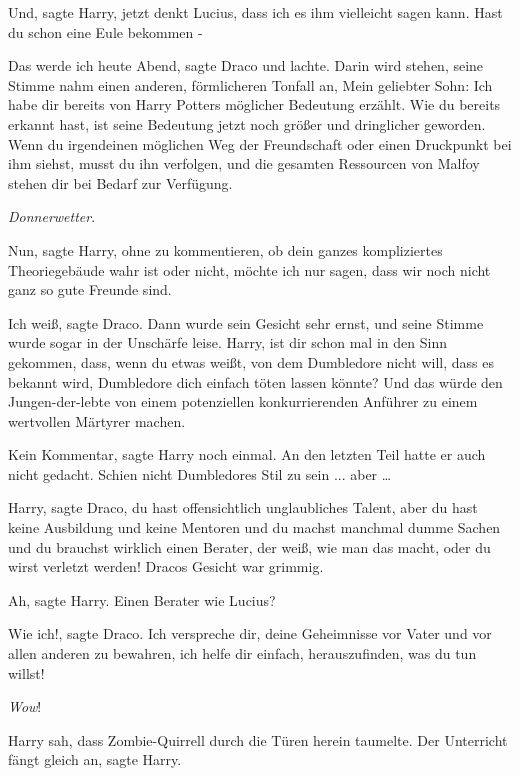 \glqq Und\grqq{}, sagte Harry, \glqq jetzt denkt Lucius, dass ich es ihm
vielleicht sagen kann. Hast du schon eine Eule bekommen -\grqq{}

\glqq Das werde ich heute Abend\grqq{}, sagte Draco und lachte. \glqq Darin wird
stehen\grqq{}, seine Stimme nahm einen anderen, förmlicheren Tonfall an, \glqq
Mein geliebter Sohn: Ich habe dir bereits von Harry Potters möglicher Bedeutung
erzählt. Wie du bereits erkannt hast, ist seine Bedeutung jetzt noch größer und
dringlicher geworden. Wenn du irgendeinen möglichen Weg der Freundschaft oder
einen Druckpunkt bei ihm siehst, musst du ihn verfolgen, und die gesamten
Ressourcen von Malfoy stehen dir bei Bedarf zur Verfügung.\grqq{}

\emph{Donnerwetter}.

\glqq Nun\grqq{}, sagte Harry, \glqq ohne zu kommentieren, ob dein ganzes
kompliziertes Theoriegebäude wahr ist oder nicht, möchte ich nur sagen, dass wir
noch nicht ganz so gute Freunde sind.\grqq{}

\glqq Ich weiß\grqq{}, sagte Draco. Dann wurde sein Gesicht sehr ernst, und
seine Stimme wurde sogar in der Unschärfe leise. \glqq Harry, ist dir schon mal
in den Sinn gekommen, dass, wenn du etwas weißt, von dem Dumbledore nicht will,
dass es bekannt wird, Dumbledore dich einfach töten lassen könnte? Und das würde
den Jungen-der-lebte von einem potenziellen konkurrierenden Anführer zu einem
wertvollen Märtyrer machen.\grqq{}

\glqq Kein Kommentar\grqq{}, sagte Harry noch einmal. An den letzten Teil hatte
er auch nicht gedacht. Schien nicht Dumbledores Stil zu sein ... aber …

\glqq Harry\grqq{}, sagte Draco, \glqq du hast offensichtlich unglaubliches
Talent, aber du hast keine Ausbildung und keine Mentoren und du machst manchmal
dumme Sachen und du brauchst wirklich einen Berater, der weiß, wie man das
macht, oder du wirst verletzt werden!\grqq{} Dracos Gesicht war grimmig.

\glqq Ah\grqq{}, sagte Harry. \glqq Einen Berater wie Lucius?\grqq{}

\glqq Wie ich!\grqq{}, sagte Draco. \glqq Ich verspreche dir, deine Geheimnisse
vor Vater und vor allen anderen zu bewahren, ich helfe dir einfach,
herauszufinden, was du tun willst!\grqq{}

\emph{Wow}!

Harry sah, dass Zombie-Quirrell durch die Türen herein taumelte. \glqq Der
Unterricht fängt gleich an\grqq{}, sagte Harry.

